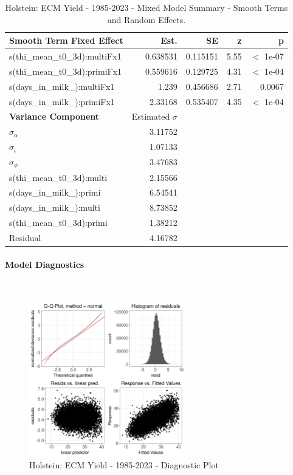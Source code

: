 \newpage
\begin{table}[H]
\centering
\begin{tabular}
{l | r | r | r | r}
\textbf{Smooth Term Fixed Effect} & Est. & SE & z & p\\
\hline
\hline
s(thi\_mean\_t0\_3d):multiFx1 & 0.638531  &  0.115151   & 5.55 &  $<$ 1e-07 \\
s(thi\_mean\_t0\_3d):primiFx1 & 0.559616  &  0.129725   &  4.31  &  $<$ 1e-04\\
s(days\_in\_milk\_):multiFx1 &  1.239    & 0.456686 &   2.71  &  0.0067\\
s(days\_in\_milk\_):primiFx1 & 2.33168  &   0.535407  &   4.35  &  $<$ 1e-04\\
\hline
\textbf{Variance Component} & Estimated $\sigma$ & & & \\
\hline
\hline
$\sigma_\alpha$ & 3.11752 & &  & \\
$\sigma_\iota$ & 1.07133 & & & \\
$\sigma_\phi$ & 3.47683 & & & \\
s(thi\_mean\_t0\_3d):multi & 2.15566 & & & \\
s(days\_in\_milk\_):primi & 6.54541 & & & \\
s(days\_in\_milk\_):multi & 8.73852 & & & \\
s(thi\_mean\_t0\_3d):primi & 1.38212 & & & \\
Residual & 4.16782 & & & \\
\end{tabular}
\caption[]{Holstein: ECM Yield - 1985-2023 - Mixed Model Summary - Smooth Terms and Random Effects.}
\end{table}



\paragraph{Model Diagnostics} \quad \\
\begin{figure}[H]
    \centering
    \includegraphics[width=0.6\textwidth]{thesis/figures/models/ecm/full/ho_ecm_full/ho_ecm_full_diagnostics.png}
    \caption[]{Holstein: ECM Yield - 1985-2023 - Diagnostic Plot}
\end{figure}

